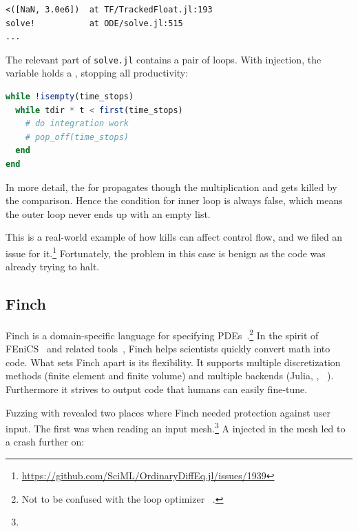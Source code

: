 \documentclass{juliacon}
\begin{document}
\begin{lstlisting}
<([NaN, 3.0e6])  at TF/TrackedFloat.jl:193
solve!           at ODE/solve.jl:515
...
\end{lstlisting}

The relevant part of \texttt{solve.jl} contains a pair of loops.
With injection, the variable  holds a \NaN{},
stopping all productivity:


\begin{lstlisting}[language = Julia]
while !isempty(time_stops)
  while tdir * t < first(time_stops)
    # do integration work
    # pop_off(time_stops)
  end
end
\end{lstlisting}

In more detail, the \NaN{} for  propagates though the multiplication
and gets killed by the \code{<} comparison.
Hence the condition for inner  loop is always false,
which means the outer loop never ends up with an empty list.

This is a real-world example of how \NaN{} kills can affect control flow, and we filed
an issue for it.\footnote{\url{https://github.com/SciML/OrdinaryDiffEq.jl/issues/1939}}
Fortunately, the problem in this case is benign as the code was already trying to halt.


\subsection{Finch}
\label{s:finch}

Finch is a domain-specific language for specifying
PDEs~\cite{heislerFinchDomainSpecific2022}.\footnote{Not to be confused
with the loop optimizer ~\cite{adka-cgo-2023}.}
In the spirit of FEniCS~\cite{fenics} and related
tools~\cite{freefem,openfoam,dune,firedrake},
Finch helps scientists quickly convert math into code.
What sets Finch apart is its flexibility.
It supports multiple discretization methods (finite element and finite
volume) and multiple backends (Julia, \CPP{}, \Dendro{}~\cite{dendro}).
Furthermore it strives to output code that humans can easily fine-tune.

Fuzzing with \TF{} revealed two places where Finch needed
protection against user input.
The first was when reading an input mesh.\footnote{}
A \NaN{} injected in the mesh led to a crash further on:
\end{document}
